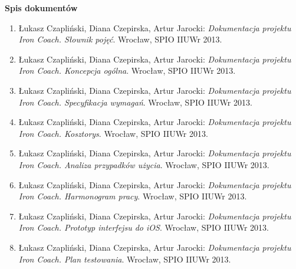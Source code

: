 


\newcommand{\quickbib}[1]{\item Łukasz Czapliński, Diana Czepirska, Artur Jarocki: {\it Dokumentacja projektu Iron Coach. #1}. Wrocław, SPIO IIUWr 2013.}

\vspace*{1cm}
{\textbf{\large{Spis dokumentów}}}\vspace{0.5cm}
\begin{enumerate}\itemsep5pt
      \quickbib{Słownik pojęć}
      \quickbib{Koncepcja ogólna}
      \quickbib{Specyfikacja wymagań}
      \quickbib{Kosztorys}
      \quickbib{Analiza przypadków użycia}
      \quickbib{Harmonogram pracy}
      \quickbib{Prototyp interfejsu do iOS}
      \quickbib{Plan testowania}
\end{enumerate}
\vfill


